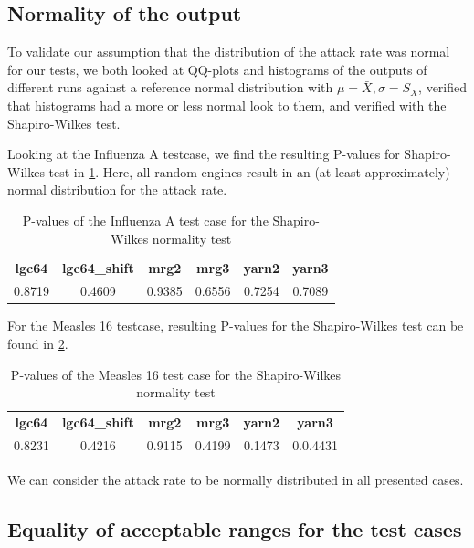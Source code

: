\documentclass{acmart}
\begin{document}
\subsection{Normality of the output}
\label{par:normality}
To validate our assumption that the distribution of the attack rate was normal for our tests, we both looked at QQ-plots and histograms of the outputs of different runs against a reference normal distribution with $\mu = \bar{X}, \sigma=S_X$, verified that histograms had a more or less normal look to them, and verified with the Shapiro-Wilkes test.

Looking at the Influenza A testcase, we find the resulting P-values for Shapiro-Wilkes test in \cref{tab:influenza_a:shapiro}. Here, all random engines result in an (at least approximately) normal distribution for the attack rate.
\begin{table}[!hbt]
    \begin{tabular}{c c c c c c}
       \textbf{lgc64} & \textbf{lgc64\_shift} & \textbf{mrg2} & \textbf{mrg3} & \textbf{yarn2} & \textbf{yarn3}\\
        0.8719 & 0.4609 & 0.9385 & 0.6556 & 0.7254 & 0.7089
    \end{tabular}
    \caption{P-values of the Influenza A test case for the Shapiro-Wilkes normality test}
    \label{tab:influenza_a:shapiro}
\end{table}


For the Measles 16 testcase, resulting P-values for the Shapiro-Wilkes test can be found in \cref{tab:measles_16:shapiro}.

\begin{table}[!hbt]
    \begin{tabular}{c c c c c c}
       \textbf{lgc64} & \textbf{lgc64\_shift} & \textbf{mrg2} & \textbf{mrg3} & \textbf{yarn2} & \textbf{yarn3}\\
        0.8231 & 0.4216 & 0.9115 & 0.4199 & 0.1473 & 0.0.4431
    \end{tabular}
    \caption{P-values of the Measles 16 test case for the Shapiro-Wilkes normality test}
    \label{tab:measles_16:shapiro}
\end{table}

We can consider the attack rate to be normally distributed in all presented cases.


\subsection{Equality of acceptable ranges for the test cases}
\end{document}
